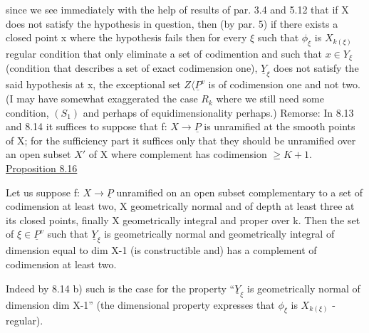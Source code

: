 
since we see immediately with the help of results of par. 3.4 and
5.12 that if X does not satisfy the hypothesis in question, then
(by par. 5) if there exists a closed point x where the hypothesis
fails then for every $\xi$ such that $\phi_{\xi}$ is $X_{k(\xi)}$ regular condition that
only eliminate a set of codimention and such that $x \in Y_{\xi}$ (condition
that describes a set of exact codimension one), $\underline{Y}_{\xi}$ does not satisfy
the said hypothesis at x, the exceptional set $Z \langle \underline{P}^{v}$ is of
codimension one and not two.  (I may have somewhat exaggerated the
case $R_{k}$ where we still need some condition, $(S_{1})$ and perhaps of
equidimensionality perhaps.)
Remorse: In 8.13 and 8.14 it suffices to suppose that f: $X \rightarrow \underline{P}$ is
unramified at the smooth points of X; for the sufficiency part it
suffices only that they should be unramified over an open subset $X'$
of X where complement has codimension $\geq K + 1$.
\uline{Proposition 8.16}

Let us suppose f: $X \rightarrow \underline{P}$ unramified on an open subset
complementary to a set of codimension at least two, X
geometrically normal and of depth at least three at its closed
points, finally X geometrically integral and proper over k.  Then
the set of $\xi \in \underline{P}^{v}$ such that $\underline{Y}_{\xi}$ is geometrically normal and
geometrically integral of dimension equal to dim X-1 (is
constructible and) has a complement of codimension at least two.

Indeed by 8.14 b) such is the case for the property ``$\underline{Y}_{\xi}$ is
geometrically normal of dimension dim X-1'' (the dimensional
property expresses that $\phi_{\xi}$ is $X_{k(\xi)}$ - regular).
